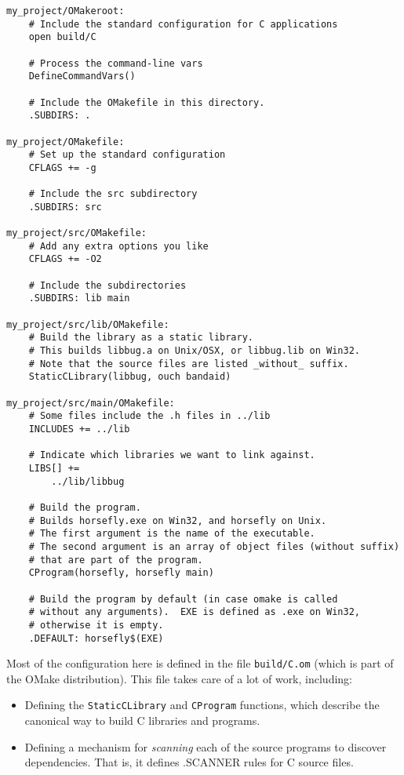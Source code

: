 \begin{verbatim}
my_project/OMakeroot:
    # Include the standard configuration for C applications
    open build/C
    
    # Process the command-line vars
    DefineCommandVars()
    
    # Include the OMakefile in this directory.
    .SUBDIRS: .

my_project/OMakefile:
    # Set up the standard configuration
    CFLAGS += -g

    # Include the src subdirectory
    .SUBDIRS: src

my_project/src/OMakefile:
    # Add any extra options you like
    CFLAGS += -O2

    # Include the subdirectories
    .SUBDIRS: lib main

my_project/src/lib/OMakefile:
    # Build the library as a static library.
    # This builds libbug.a on Unix/OSX, or libbug.lib on Win32.
    # Note that the source files are listed _without_ suffix.
    StaticCLibrary(libbug, ouch bandaid)

my_project/src/main/OMakefile:
    # Some files include the .h files in ../lib
    INCLUDES += ../lib

    # Indicate which libraries we want to link against.
    LIBS[] +=
        ../lib/libbug

    # Build the program.
    # Builds horsefly.exe on Win32, and horsefly on Unix.
    # The first argument is the name of the executable.
    # The second argument is an array of object files (without suffix)
    # that are part of the program.
    CProgram(horsefly, horsefly main)

    # Build the program by default (in case omake is called
    # without any arguments).  EXE is defined as .exe on Win32,
    # otherwise it is empty.
    .DEFAULT: horsefly$(EXE)
\end{verbatim}

Most of the configuration here is defined in the file \verb+build/C.om+ (which is part of the OMake
distribution).  This file takes care of a lot of work, including:
\begin{itemize}
\item Defining the \verb+StaticCLibrary+ and \verb+CProgram+ functions, which describe the canonical
way to build C libraries and programs.
\item Defining a mechanism for \emph{scanning} each of the source programs to discover dependencies.
That is, it defines .SCANNER rules for C source files.
\end{itemize}

